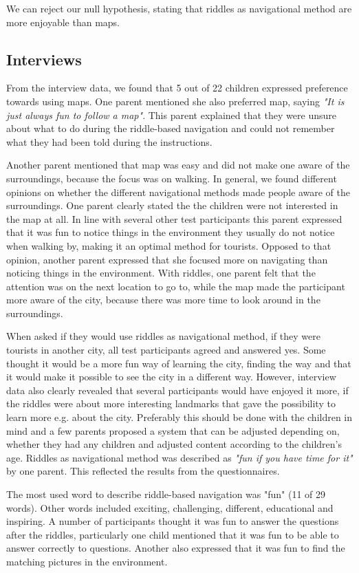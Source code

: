 We can reject our null hypothesis, stating that riddles as navigational method are more enjoyable than maps.

\subsection{Interviews}
From the interview data, we found that 5 out of 22 children expressed preference towards using maps. One parent mentioned she also preferred map, saying \textit{"It is just always fun to follow a map"}. This parent explained that they were unsure about what to do during the riddle-based navigation and could not remember what they had been told during the instructions. 

Another parent mentioned that map was easy and did not make one aware of the surroundings, because the focus was on walking. In general, we found different opinions on whether the different navigational methods made people aware of the surroundings. One parent clearly stated the the children were not interested in the map at all. In line with several other test participants this parent expressed that it was fun to notice things in the environment they usually do not notice when walking by, making it an optimal method for tourists. Opposed to that opinion, another parent expressed that she focused more on navigating than noticing things in the environment. With riddles, one parent felt that the attention was on the next location to go to, while the map made the participant more aware of the city, because there was more time to look around in the surroundings. 

When asked if they would use riddles as navigational method, if they were tourists in another city, all test participants agreed and answered yes. Some thought it would be a more fun way of learning the city, finding the way and that it would make it possible to see the city in a different way. However, interview data also clearly revealed that several participants would have enjoyed it more, if the riddles were about more interesting landmarks that gave the possibility to learn more e.g. about the city. Preferably this should be done with the children in mind and a few parents proposed a system that can be adjusted depending on, whether they had any children and adjusted content according to the children’s age. Riddles as navigational method was described as \textit{"fun if you have time for it"} by one parent. This reflected the results from the questionnaires. 

The most used word to describe riddle-based navigation was "fun" (11 of 29 words). Other words included exciting, challenging, different, educational and inspiring. A number of participants thought it was fun to answer the questions after the riddles, particularly one child mentioned that it was fun to be able to answer correctly to questions. Another also expressed that it was fun to find the matching pictures in the environment. 


